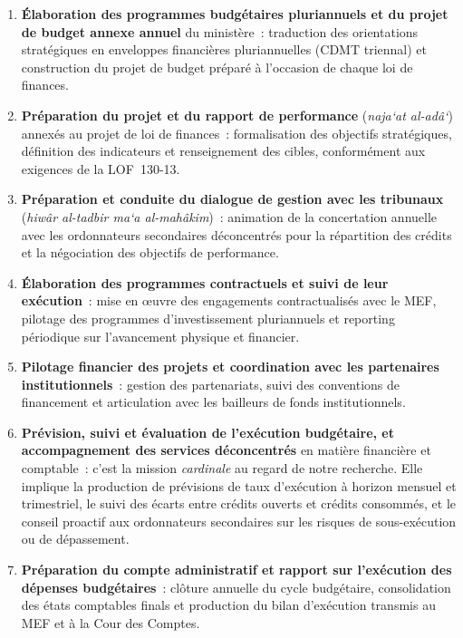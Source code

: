 \begin{enumerate}
    \item \textbf{\'Elaboration des programmes budg\'etaires pluriannuels et du projet de budget annexe annuel} du minist\`ere~: traduction des orientations strat\'egiques en enveloppes financi\`eres pluriannuelles (CDMT triennal) et construction du projet de budget pr\'epar\'e \`a l'occasion de chaque loi de finances.

    \item \textbf{Pr\'eparation du projet et du rapport de performance} (\textit{naja\textquoteleft{}at al-ad\^a\textquoteleft{}}) annex\'es au projet de loi de finances~: formalisation des objectifs strat\'egiques, d\'efinition des indicateurs et renseignement des cibles, conform\'ement aux exigences de la LOF~130-13.

    \item \textbf{Pr\'eparation et conduite du dialogue de gestion avec les tribunaux} (\textit{hiw\^ar al-tadbir ma\textquoteleft{}a al-mah\^akim})~: animation de la concertation annuelle avec les ordonnateurs secondaires d\'econcentr\'es pour la r\'epartition des cr\'edits et la n\'egociation des objectifs de performance.

    \item \textbf{\'Elaboration des programmes contractuels et suivi de leur ex\'ecution}~: mise en \oe{}uvre des engagements contractualis\'es avec le MEF, pilotage des programmes d'investissement pluriannuels et reporting p\'eriodique sur l'avancement physique et financier.

    \item \textbf{Pilotage financier des projets et coordination avec les partenaires institutionnels}~: gestion des partenariats, suivi des conventions de financement et articulation avec les bailleurs de fonds institutionnels.

    \item \textbf{Pr\'evision, suivi et \'evaluation de l'ex\'ecution budg\'etaire, et accompagnement des services d\'econcentr\'es} en mati\`ere financi\`ere et comptable~: c'est la mission \textit{cardinale} au regard de notre recherche. Elle implique la production de pr\'evisions de taux d'ex\'ecution \`a horizon mensuel et trimestriel, le suivi des \'ecarts entre cr\'edits ouverts et cr\'edits consomm\'es, et le conseil proactif aux ordonnateurs secondaires sur les risques de sous-ex\'ecution ou de d\'epassement.

    \item \textbf{Pr\'eparation du compte administratif et rapport sur l'ex\'ecution des d\'epenses budg\'etaires}~: cl\^oture annuelle du cycle budg\'etaire, consolidation des \'etats comptables finals et production du bilan d'ex\'ecution transmis au MEF et \`a la Cour des Comptes.
\end{enumerate}

